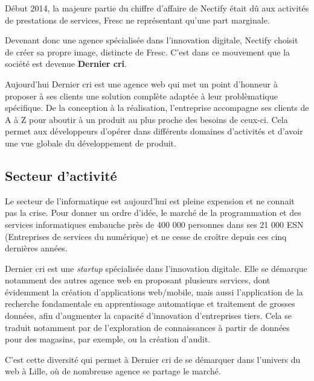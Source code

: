 \bigskip

Début 2014, la majeure partie du chiffre d'affaire de Nectify était dû
aux activités de prestations de services, Fresc ne représentant qu'une
part marginale.

\bigskip

Devenant donc une agence spécialisée dans l'innovation digitale, Nectify
choisit de créer sa propre image, distincte de Fresc. C'est dans ce
mouvement que la société est devenue \textbf{Dernier cri}.

\bigskip

Aujourd'hui Dernier cri est une agence web qui met un point d'honneur à
proposer à ses clients une solution complète adaptée à leur
problèmatique spécifique. De la conception à la réalisation,
l'entreprise accompagne ses clients de A à Z pour aboutir à un produit
au plus proche des besoins de ceux-ci. Cela permet aux développeurs
d'opérer dans différents domaines d'activités et d'avoir une vue globale
du développement de produit.

\bigskip

\subsection{Secteur d'activité}\label{secteur-dactivituxe9}

\bigskip

Le secteur de l'informatique est aujourd'hui est pleine expension et ne
connait pas la crise. Pour donner un ordre d'idée, le marché de la
programmation et des services informatiques embauche près de 400 000
personnes dans ses 21 000 ESN (Entreprises de services du numérique) et
ne cesse de croître depuis ces cinq dernières années.

\bigskip

Dernier cri est une \emph{startup} spécialisée dans l'innovation
digitale. Elle se démarque notamment des autres agence web en proposant
plusieurs services, dont évidemment la création d'applications
web/mobile, mais aussi l'application de la recherche fondamentale en
apprentissage automatique et traitement de grosses données, afin
d'augmenter la capacité d'innovation d'entreprises tiers. Cela se
traduit notamment par de l'exploration de connaissances à partir de
données pour des magasins, par exemple, ou la création d'audit.

\bigskip

C'est cette diversité qui permet à Dernier cri de se démarquer dans
l'univers du web à Lille, où de nombreuse agence se partage le marché.

